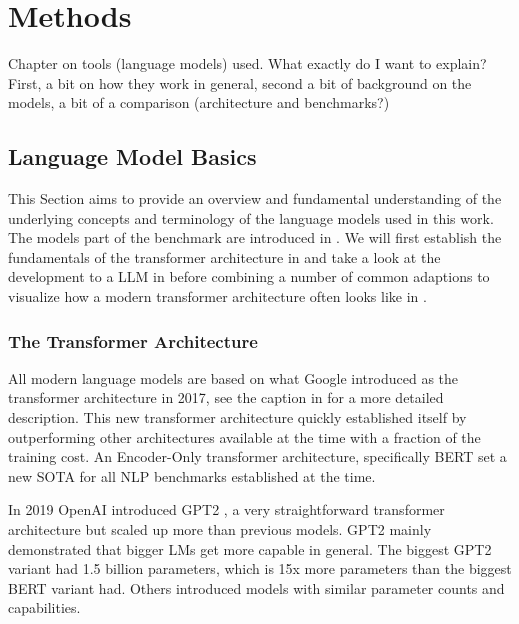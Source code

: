 \chapter{Methods}\label{chap:methods}
{\color{blue}
Chapter on tools (language models) used. What exactly do I want to explain?
First, a bit on how they work in general, second a bit of background on the models, a bit of a comparison (architecture and benchmarks?)
}


\section{Language Model Basics}\label{sec:basics}
This Section aims to provide an overview and fundamental understanding of the underlying concepts and terminology of the language models used in this work.
The models part of the benchmark are introduced in .
We will first establish the fundamentals of the transformer architecture in  and take a look at the development to a \acrlong{LLM} in  before combining a number of common adaptions to visualize how a modern transformer architecture often looks like in .


\subsection{The Transformer Architecture}\label{sub:transformer}


All modern language models are based on what Google introduced as the transformer architecture \cite{vaswani_attention_2017} in 2017, see the caption in  for a more detailed description. 
This new transformer architecture quickly established itself by outperforming other architectures available at the time with a fraction of the training cost.
An Encoder-Only transformer architecture, specifically \gls{BERT} set a new \gls{SOTA} for all \gls{NLP} benchmarks established at the time.

In 2019 \gls{OpenAI} introduced \gls{GPT2} \cite{radford_language_2019}, a very straightforward transformer architecture but scaled up more than previous models. \gls{GPT2} mainly demonstrated that bigger \glspl{LM} get more capable in general.
The biggest \gls{GPT2} variant had 1.5 billion parameters, which is 15x more parameters than the biggest \gls{BERT} variant had.
Others introduced models with similar parameter counts and capabilities.


